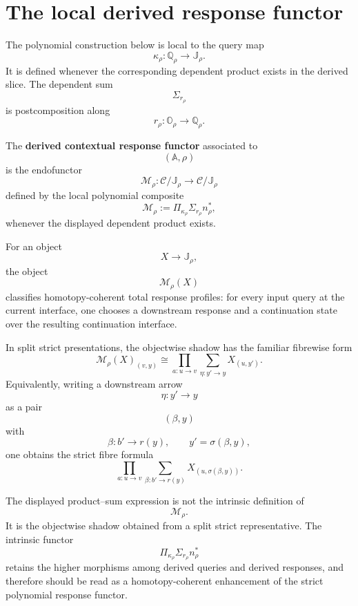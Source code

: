 \section{The local derived response functor}
\label{sec:derived-poly-response-polynomial}

The polynomial construction below is local to the query map
\[
\kappa_\rho:\mathbb Q_\rho\to\mathbb J_\rho.
\]
It is defined whenever the corresponding dependent product exists in the
derived slice.  The dependent sum
\[
\Sigma_{r_\rho}
\]
is postcomposition along
\[
r_\rho:\mathbb O_\rho\to\mathbb Q_\rho.
\]

\begin{definition}
\label{def:derived-poly-response-functor}
The \textbf{derived contextual response functor} associated to
\[
(\mathbb A,\rho)
\]
is the endofunctor
\[
\mathcal M_\rho:
\mathcal C/\mathbb J_\rho\to\mathcal C/\mathbb J_\rho
\]
defined by the local polynomial composite
\[
\mathcal M_\rho
:=
\Pi_{\kappa_\rho}\Sigma_{r_\rho}n_\rho^\ast,
\]
whenever the displayed dependent product exists.
\end{definition}

For an object
\[
X\to\mathbb J_\rho,
\]
the object
\[
\mathcal M_\rho(X)
\]
classifies homotopy-coherent total response profiles: for every input query at
the current interface, one chooses a downstream response and a continuation
state over the resulting continuation interface.

In split strict presentations, the objectwise shadow has the familiar
fibrewise form
\[
\mathcal M_\rho(X)_{(v,y)}
\cong
\prod_{a:u\to v}
\sum_{\eta:y'\to y}
X_{(u,y')}.
\]
Equivalently, writing a downstream arrow
\[
\eta:y'\to y
\]
as a pair
\[
(\beta,y)
\]
with
\[
\beta:b'\to r(y),
\qquad
y'=\sigma(\beta,y),
\]
one obtains the strict fibre formula
\[
\prod_{a:u\to v}
\sum_{\beta:b'\to r(y)}
X_{(u,\sigma(\beta,y))}.
\]

\begin{remark}
\label{rem:derived-poly-homotopy-coherent-profiles}
The displayed product--sum expression is not the intrinsic definition of
\[
\mathcal M_\rho.
\]
It is the objectwise shadow obtained from a split strict representative.  The
intrinsic functor
\[
\Pi_{\kappa_\rho}\Sigma_{r_\rho}n_\rho^\ast
\]
retains the higher morphisms among derived queries and derived responses, and
therefore should be read as a homotopy-coherent enhancement of the strict
polynomial response functor.
\end{remark}

